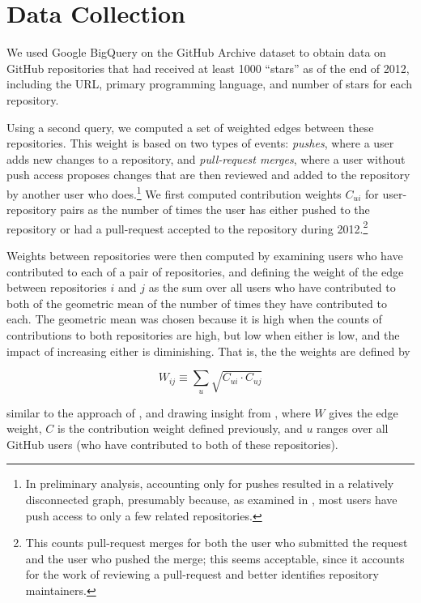 \documentclass[twocolumn]{article}
\begin{document}
\section{Data Collection}
We used Google BigQuery on the GitHub Archive dataset\cite{githubarchive} to
obtain data on GitHub repositories that had received at least 1000 ``stars'' as
of the end of 2012, including the URL, primary programming language, and number
of stars for each repository.

Using a second query, we computed a set of weighted edges between these
repositories. This weight is based on two types of events: \emph{pushes}, where
a user adds new changes to a repository, and \emph{pull-request merges}, where a
user without push access proposes changes that are then reviewed and added to
the repository by another user who does.\footnote{In preliminary analysis,
accounting only for pushes resulted in a relatively disconnected graph,
presumably because, as examined in \cite{khadke}, most users have push access to only a few related
repositories.} We first computed contribution weights $C_{ui}$ for
user-repository pairs as the number of times the user has either pushed to the
repository or had a pull-request accepted to the repository during
2012.\footnote{This counts pull-request merges for both the user who submitted
the request and the user who pushed the merge; this seems acceptable, since it
accounts for the work of reviewing a pull-request and better identifies
repository maintainers.}

Weights between repositories were then computed by examining users who have
contributed to each of a pair of repositories, and defining the weight of the
edge between repositories $i$ and $j$ as the sum over all users who have
contributed to both of the geometric mean of the number of times they have
contributed to each. The geometric mean was chosen because it is high when the
counts of contributions to both repositories are high, but low when either is
low, and the impact of increasing either is diminishing. That is, the the
weights are defined by

\begin{equation}
    W_{ij} \equiv \sum_u \sqrt{C_{ui} \cdot C_{uj}}
\end{equation}

similar to the approach of \cite{marrama}, and drawing insight from
\cite{opsahlproj,opsahl11}, where $W$ gives the edge weight, $C$ is the
contribution weight defined previously, and $u$ ranges over all GitHub users
(who have contributed to both of these repositories).
\end{document}
